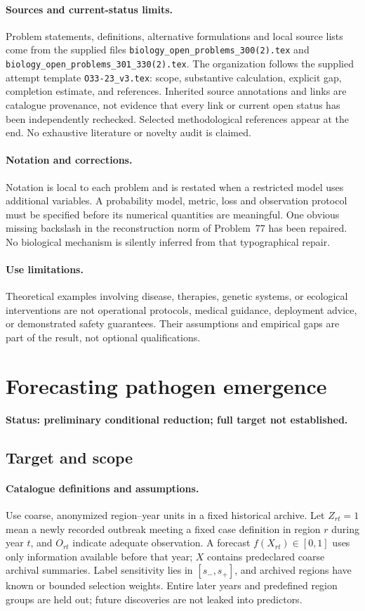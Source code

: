 \documentclass[11pt]{article}
\begin{document}
\paragraph{Sources and current-status limits.}
Problem statements, definitions, alternative formulations and local source lists
come from the supplied files
\texttt{biology\_open\_problems\_300(2).tex} and
\texttt{biology\_open\_problems\_301\_330(2).tex}.
The organization follows the supplied attempt template
\texttt{O33-23\_v3.tex}: scope, substantive calculation, explicit gap,
completion estimate, and references. Inherited source annotations and links are
catalogue provenance, not evidence that every link or current open status has
been independently rechecked. Selected methodological references appear at the
end. No exhaustive literature or novelty audit is claimed.

\paragraph{Notation and corrections.}
Notation is local to each problem and is restated when a restricted model uses
additional variables. A probability model, metric, loss and observation protocol
must be specified before its numerical quantities are meaningful. One obvious
missing backslash in the reconstruction norm of Problem~77 has been repaired.
No biological mechanism is silently inferred from that typographical repair.

\paragraph{Use limitations.}
Theoretical examples involving disease, therapies, genetic systems, or ecological
interventions are not operational protocols, medical guidance, deployment advice,
or demonstrated safety guarantees. Their assumptions and empirical gaps are part
of the result, not optional qualifications.


\section*{Forecasting pathogen emergence}
\label{prob:218}
\noindent\textbf{Status: preliminary conditional reduction; full target not established.}
\subsection{Target and scope}
\paragraph{Catalogue definitions and assumptions.}
Use coarse, anonymized region--year units in a fixed historical archive. Let $Z_{rt}=1$ mean a newly recorded outbreak meeting a fixed case definition in region $r$ during year $t$, and $O_{rt}$ indicate adequate observation. A forecast $f(X_{rt})\in[0,1]$ uses only information available before that year; $X$ contains predeclared coarse archival summaries. Label sensitivity lies in $[s_-,s_+]$, and archived regions have known or bounded selection weights. Entire later years and predefined region groups are held out; future discoveries are not leaked into predictors.
\end{document}
